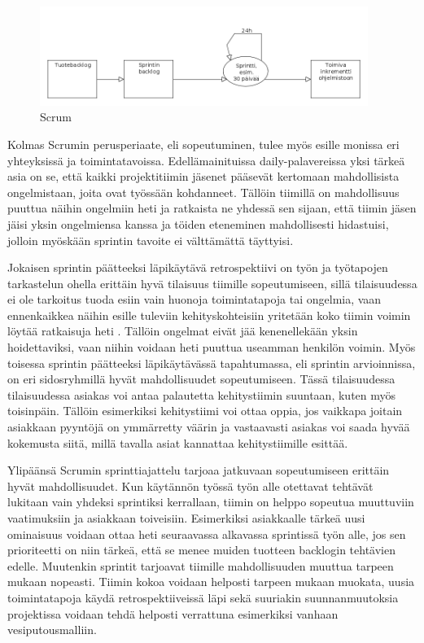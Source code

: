 \documentclass[finnish,nonumbib,nocopyright]{gradu2}
\begin{document}
\begin{figure}
\centering
\includegraphics[width=0.95\textwidth]{scrum}
\caption{Scrum \cite{scrumkuva}}
\end{figure}

Kolmas Scrumin perusperiaate, eli sopeutuminen, tulee myös esille monissa eri yhteyksissä ja toimintatavoissa. Edellämainituissa daily-palavereissa yksi tärkeä asia on se, että kaikki projektitiimin jäsenet pääsevät kertomaan mahdollisista ongelmistaan, joita ovat työssään kohdanneet. Tällöin tiimillä on mahdollisuus puuttua näihin ongelmiin heti ja ratkaista ne yhdessä sen sijaan, että tiimin jäsen jäisi yksin ongelmiensa kanssa ja töiden eteneminen mahdollisesti hidastuisi, jolloin myöskään sprintin tavoite ei välttämättä täyttyisi. 

Jokaisen sprintin päätteeksi läpikäytävä retrospektiivi on työn ja työtapojen tarkastelun ohella erittäin hyvä tilaisuus tiimille sopeutumiseen, sillä tilaisuudessa ei ole tarkoitus tuoda esiin vain huonoja toimintatapoja tai ongelmia, vaan ennenkaikkea näihin esille tuleviin kehityskohteisiin yritetään koko tiimin voimin löytää ratkaisuja heti \cite{msretro}. Tällöin ongelmat eivät jää kenenellekään yksin hoidettaviksi, vaan niihin voidaan heti puuttua useamman henkilön voimin. Myös toisessa sprintin päätteeksi läpikäytävässä tapahtumassa, eli sprintin arvioinnissa, on eri sidosryhmillä hyvät mahdollisuudet sopeutumiseen. Tässä tilaisuudessa tilaisuudessa asiakas voi antaa palautetta kehitystiimin suuntaan, kuten myös toisinpäin. Tällöin esimerkiksi kehitystiimi voi ottaa oppia, jos vaikkapa joitain asiakkaan pyyntöjä on ymmärretty väärin ja vastaavasti asiakas voi saada hyvää kokemusta siitä, millä tavalla asiat kannattaa kehitystiimille esittää.

Ylipäänsä Scrumin sprinttiajattelu tarjoaa jatkuvaan sopeutumiseen erittäin hyvät mahdollisuudet. Kun käytännön työssä työn alle otettavat tehtävät lukitaan vain yhdeksi sprintiksi kerrallaan, tiimin on helppo sopeutua muuttuviin vaatimuksiin ja asiakkaan toiveisiin. Esimerkiksi asiakkaalle tärkeä uusi ominaisuus voidaan ottaa heti seuraavassa alkavassa sprintissä työn alle, jos sen prioriteetti on niin tärkeä, että se menee muiden tuotteen backlogin tehtävien edelle. Muutenkin sprintit tarjoavat tiimille mahdollisuuden muuttua tarpeen mukaan nopeasti. Tiimin kokoa voidaan helposti tarpeen mukaan muokata, uusia toimintatapoja käydä retrospektiiveissä läpi sekä suuriakin suunnanmuutoksia projektissa voidaan tehdä helposti verrattuna esimerkiksi vanhaan vesiputousmalliin.
\end{document}
